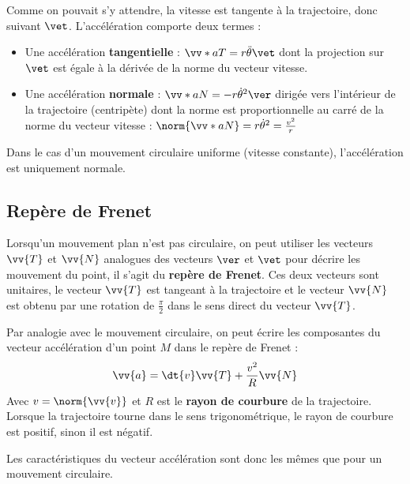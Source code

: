 \documentclass{cours}
\begin{document}
Comme on pouvait s'y attendre, la vitesse est tangente à la trajectoire, donc suivant $\vet$.  L'accélération comporte deux termes :
\begin{itemize}
  \item Une accélération \textbf{tangentielle} : $\vv*{a}{T} = r \ddot{\theta}\vet$ dont la projection sur $\vet$  est égale à la dérivée de la norme du vecteur vitesse.
  \item Une accélération \textbf{normale} : $\vv*{a}{N} = -r \dot{\theta}^2\ver$ dirigée vers l'intérieur de la trajectoire (centripète) dont la norme est proportionnelle au carré de la norme du vecteur vitesse : $\norm{\vv*{a}{N}} = r \dot{\theta}^2 = \frac{v^2}{r}$
\end{itemize}

Dans le cas d'un mouvement circulaire uniforme (vitesse constante), l'accélération est uniquement normale.


\subsection{Repère de Frenet}%
\label{sub:repere_de_frenet}

Lorsqu'un mouvement plan n'est pas circulaire, on peut utiliser les vecteurs $\vv{T}$ et $\vv{N}$ analogues des vecteurs $\ver$ et $\vet$ pour décrire les mouvement du point, il s'agit du \textbf{repère de Frenet}. Ces deux vecteurs sont unitaires, le vecteur $\vv{T}$ est tangeant à la trajectoire et le vecteur $\vv{N}$ est obtenu par une rotation de $\frac{\pi}{2}$ dans le sens direct du vecteur $\vv{T}$.   

\begin{center}
\end{center}

Par analogie avec le mouvement circulaire, on peut écrire les composantes du vecteur accélération d'un point $M$ dans le repère de Frenet :
\begin{equation}
  \vv{a} = \dt{v}\vv{T} + \frac{v^2}{R}\vv{N}
\end{equation}
Avec $v=\norm{\vv{v}}$ et $R$ est le \textbf{rayon de courbure}  de la trajectoire. Lorsque la trajectoire tourne dans le sens trigonométrique, le rayon de courbure est positif, sinon il est négatif.

Les caractéristiques du vecteur accélération sont donc les mêmes que pour un mouvement circulaire. 
\end{document}
